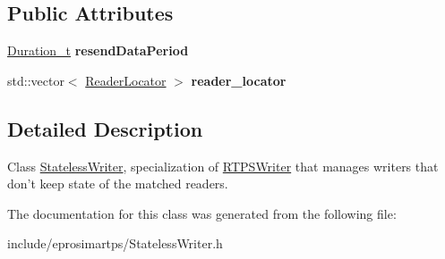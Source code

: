 \subsection*{\-Public \-Attributes}
\begin{DoxyCompactItemize}
\item 
\hypertarget{classeprosima_1_1rtps_1_1_stateless_writer_a89a9ebe6fc06f3e1c838b111a120513e}{\hyperlink{structeprosima_1_1rtps_1_1_time__t}{\-Duration\-\_\-t} {\bfseries resend\-Data\-Period}}\label{classeprosima_1_1rtps_1_1_stateless_writer_a89a9ebe6fc06f3e1c838b111a120513e}

\item 
\hypertarget{classeprosima_1_1rtps_1_1_stateless_writer_abc8d36ccbb27456e8078ca15ec96ecd5}{std\-::vector$<$ \hyperlink{classeprosima_1_1rtps_1_1_reader_locator}{\-Reader\-Locator} $>$ {\bfseries reader\-\_\-locator}}\label{classeprosima_1_1rtps_1_1_stateless_writer_abc8d36ccbb27456e8078ca15ec96ecd5}

\end{DoxyCompactItemize}


\subsection{\-Detailed \-Description}
\-Class \hyperlink{classeprosima_1_1rtps_1_1_stateless_writer}{\-Stateless\-Writer}, specialization of \hyperlink{classeprosima_1_1rtps_1_1_r_t_p_s_writer}{\-R\-T\-P\-S\-Writer} that manages writers that don't keep state of the matched readers. 

\-The documentation for this class was generated from the following file\-:\begin{DoxyCompactItemize}
\item 
include/eprosimartps/\-Stateless\-Writer.\-h\end{DoxyCompactItemize}
